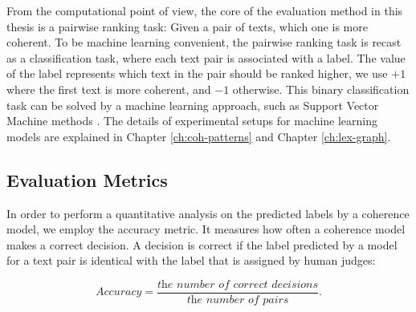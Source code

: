 From the computational point of view, the core of the evaluation method in this thesis is a pairwise ranking task: Given a pair of texts, which one is more coherent. 
To be machine learning convenient, the pairwise ranking task is recast as a classification task, where each text pair is associated with a label. 
The value of the label represents which text in the pair should be ranked higher, we use $+1$ where the first text is more coherent, and $-1$ otherwise. 
This binary classification task can be solved by a machine learning approach, such as Support Vector Machine methods \cite{bishop06}.  
The details of experimental setups for machine learning models are explained in Chapter \ref{ch:coh-patterns} and Chapter \ref{ch:lex-graph}.  

\subsection{Evaluation Metrics}

In order to perform a quantitative analysis on the predicted labels by a coherence model, we employ the accuracy metric. 
It measures how often a coherence model makes a correct decision. 
A decision is correct if the label predicted by a model for a text pair is identical with the label that is assigned by human judges:


\begin{equation}
Accuracy = \frac{\textit{the number of correct decisions}}{\textit{the number of pairs}}.
\end{equation}





